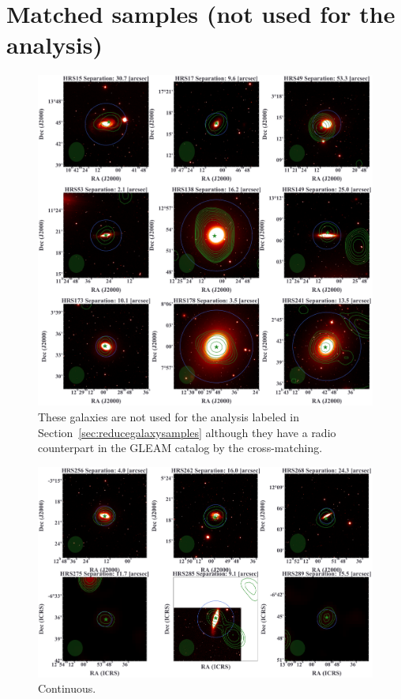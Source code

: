\documentclass[12pt,a4paper,oneside,openright,final,titlepage]{report}
\begin{document}
\section{Matched samples (not used for the analysis)}
\begin{figure}[htbp]
    \centering
    \includegraphics[width=\linewidth]{Figures/AppendixB_galaxyimages_notselected.pdf}
    \caption[Galaxy images (9/15 not used for the analysis)]{\label{fig:galaxyimages_notselected}
        These galaxies are not used for the analysis labeled in Section~\ref{sec:reducegalaxysamples} although they have a radio counterpart in the GLEAM catalog by the cross-matching.
    }
\end{figure}

\begin{figure}[htbp]
    \centering
    \includegraphics[width=\linewidth]{Figures/AppendixB_galaxyimages_notselected2.pdf}
    \caption[Galaxy images (6/15 not used for the analysis)]{\label{fig:galaxyimages_notselected}
        Continuous.
    }
\end{figure}
\end{document}

